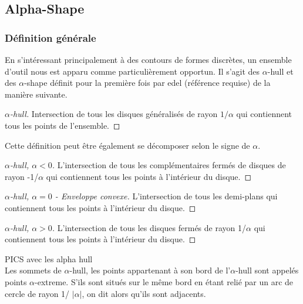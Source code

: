 \subsection{Alpha-Shape}

\subsubsection{Définition générale}

En s'intéressant principalement à des contours de formes discrètes, un ensemble d'outil nous est apparu comme particulièrement opportun. Il s'agit des $\alpha$-hull et des $\alpha$-shape définit pour la première fois par edel (référence requise) de la manière suivante.

\begin{proof}[$\alpha$-hull]
    Intersection de tous les disques généralisés de rayon $1/\alpha$ qui contiennent tous les points de l'ensemble.
\end{proof}

Cette définition peut être également se décomposer selon le signe de $\alpha$.

\begin{proof}[$\alpha$-hull, $\alpha < 0$]
    L'intersection de tous les complémentaires fermés de disques de rayon -1/$\alpha$ qui contiennent tous les points à l’intérieur du disque.
\end{proof}

\begin{proof}[$\alpha$-hull, $\alpha = 0$ - Enveloppe convexe]
      L'intersection de tous les demi-plans qui contiennent tous les points à l’intérieur du disque.
\end{proof}

\begin{proof}[$\alpha$-hull, $\alpha > 0$]
      L'intersection de tous les disques fermés de rayon 1/$\alpha$ qui contiennent tous les points à l’intérieur du disque.
\end{proof}

PICS avec les alpha hull\\

Les sommets de $\alpha$-hull, les points appartenant à son bord de l'$\alpha$-hull sont appelés points $\alpha$-extreme. S'ils sont situés sur le même bord en étant relié par un arc de cercle de rayon 1/ $\lvert \alpha \rvert$, on dit alors qu'ils sont adjacents.

